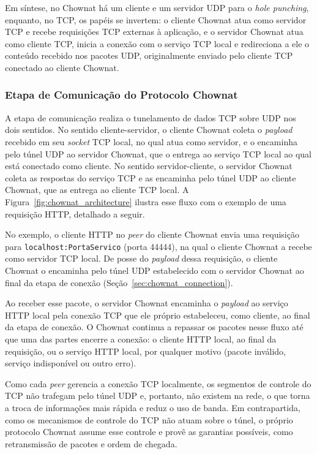Em síntese, no Chownat há um cliente e um servidor UDP para o \textit{hole punching}, enquanto, no TCP, os papéis se invertem: o cliente Chownat atua como servidor TCP e recebe requisições TCP externas à aplicação, e o servidor Chownat atua como cliente TCP, inicia a conexão com o serviço TCP local e redireciona a ele o conteúdo recebido nos pacotes UDP, originalmente enviado pelo cliente TCP conectado ao cliente Chownat.

\subsubsection{Etapa de Comunicação do Protocolo Chownat}

A etapa de comunicação realiza o tunelamento de dados TCP sobre UDP nos dois sentidos. No sentido cliente-servidor, o cliente Chownat coleta o \textit{payload} recebido em seu \textit{socket} TCP local, no qual atua como servidor, e o encaminha pelo túnel UDP ao servidor Chownat, que o entrega ao serviço TCP local ao qual está conectado como cliente. No sentido servidor-cliente, o servidor Chownat coleta as respostas do serviço TCP e as encaminha pelo túnel UDP ao cliente Chownat, que as entrega ao cliente TCP local. A Figura~\ref{fig:chownat_architecture} ilustra esse fluxo com o exemplo de uma requisição HTTP, detalhado a seguir.

No exemplo, o cliente HTTP no \textit{peer} do cliente Chownat envia uma requisição para \texttt{localhost:PortaServico} (porta 44444), na qual o cliente Chownat a recebe como servidor TCP local. De posse do \textit{payload} dessa requisição, o cliente Chownat o encaminha pelo túnel UDP estabelecido com o servidor Chownat ao final da etapa de conexão (Seção~\ref{sec:chownat_connection}).

Ao receber esse pacote, o servidor Chownat encaminha o \textit{payload} ao serviço HTTP local pela conexão TCP que ele próprio estabeleceu, como cliente, ao final da etapa de conexão. O Chownat continua a repassar os pacotes nesse fluxo até que uma das partes encerre a conexão: o cliente HTTP local, ao final da requisição, ou o serviço HTTP local, por qualquer motivo (pacote inválido, serviço indisponível ou outro erro).

Como cada \textit{peer} gerencia a conexão TCP localmente, os segmentos de controle do TCP não trafegam pelo túnel UDP e, portanto, não existem na rede, o que torna a troca de informações mais rápida e reduz o uso de banda. Em contrapartida, como os mecanismos de controle do TCP não atuam sobre o túnel, o próprio protocolo Chownat assume esse controle e provê as garantias possíveis, como retransmissão de pacotes e ordem de chegada.


